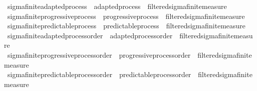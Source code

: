 \begin{isabellebody}
%
\isadelimdocument
%
\endisadelimdocument
%
\isatagdocument
%
\isamarkuptrue%
%
\endisatagdocument
{\isafolddocument}%
%
\isadelimdocument
%
\endisadelimdocument
{}\isamarkupfalse%
\ sigma{\isacharunderscore}{\kern0pt}finite{\isacharunderscore}{\kern0pt}adapted{\isacharunderscore}{\kern0pt}process\ {\isacharequal}{\kern0pt}\ adapted{\isacharunderscore}{\kern0pt}process\ {\isacharplus}{\kern0pt}\ filtered{\isacharunderscore}{\kern0pt}sigma{\isacharunderscore}{\kern0pt}finite{\isacharunderscore}{\kern0pt}measure\isanewline
{}\isamarkupfalse%
\ sigma{\isacharunderscore}{\kern0pt}finite{\isacharunderscore}{\kern0pt}progressive{\isacharunderscore}{\kern0pt}process\ {\isacharequal}{\kern0pt}\ progressive{\isacharunderscore}{\kern0pt}process\ {\isacharplus}{\kern0pt}\ filtered{\isacharunderscore}{\kern0pt}sigma{\isacharunderscore}{\kern0pt}finite{\isacharunderscore}{\kern0pt}measure\isanewline
{}\isamarkupfalse%
\ sigma{\isacharunderscore}{\kern0pt}finite{\isacharunderscore}{\kern0pt}predictable{\isacharunderscore}{\kern0pt}process\ {\isacharequal}{\kern0pt}\ predictable{\isacharunderscore}{\kern0pt}process\ {\isacharplus}{\kern0pt}\ filtered{\isacharunderscore}{\kern0pt}sigma{\isacharunderscore}{\kern0pt}finite{\isacharunderscore}{\kern0pt}measure\isanewline
\isanewline
{}\isamarkupfalse%
\ sigma{\isacharunderscore}{\kern0pt}finite{\isacharunderscore}{\kern0pt}adapted{\isacharunderscore}{\kern0pt}process{\isacharunderscore}{\kern0pt}order\ {\isacharequal}{\kern0pt}\ adapted{\isacharunderscore}{\kern0pt}process{\isacharunderscore}{\kern0pt}order\ {\isacharplus}{\kern0pt}\ filtered{\isacharunderscore}{\kern0pt}sigma{\isacharunderscore}{\kern0pt}finite{\isacharunderscore}{\kern0pt}measure\isanewline
{}\isamarkupfalse%
\ sigma{\isacharunderscore}{\kern0pt}finite{\isacharunderscore}{\kern0pt}progressive{\isacharunderscore}{\kern0pt}process{\isacharunderscore}{\kern0pt}order\ {\isacharequal}{\kern0pt}\ progressive{\isacharunderscore}{\kern0pt}process{\isacharunderscore}{\kern0pt}order\ {\isacharplus}{\kern0pt}\ filtered{\isacharunderscore}{\kern0pt}sigma{\isacharunderscore}{\kern0pt}finite{\isacharunderscore}{\kern0pt}measure\isanewline
{}\isamarkupfalse%
\ sigma{\isacharunderscore}{\kern0pt}finite{\isacharunderscore}{\kern0pt}predictable{\isacharunderscore}{\kern0pt}process{\isacharunderscore}{\kern0pt}order\ {\isacharequal}{\kern0pt}\ predictable{\isacharunderscore}{\kern0pt}process{\isacharunderscore}{\kern0pt}order\ {\isacharplus}{\kern0pt}\ filtered{\isacharunderscore}{\kern0pt}sigma{\isacharunderscore}{\kern0pt}finite{\isacharunderscore}{\kern0pt}measure\isanewline

\end{isabellebody}
